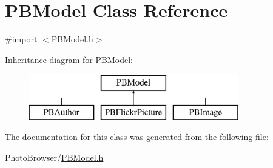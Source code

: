 \hypertarget{interface_p_b_model}{
\section{PBModel Class Reference}
\label{interface_p_b_model}
}


{\ttfamily \#import $<$PBModel.h$>$}

Inheritance diagram for PBModel:\begin{figure}[H]
\begin{center}
\leavevmode
\includegraphics[height=2cm]{interface_p_b_model}
\end{center}
\end{figure}


The documentation for this class was generated from the following file:\begin{DoxyCompactItemize}
\item 
PhotoBrowser/\hyperlink{_p_b_model_8h}{PBModel.h}\end{DoxyCompactItemize}
